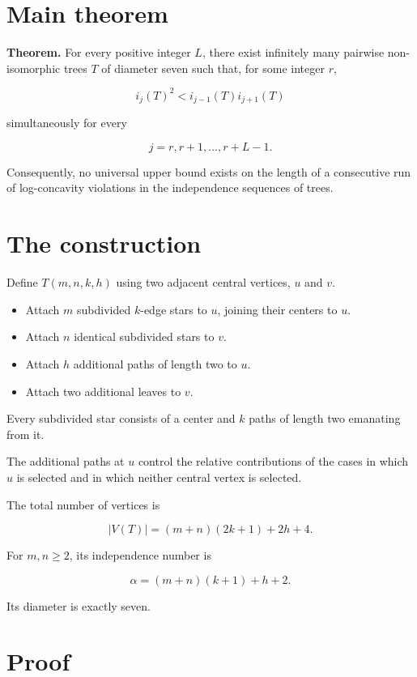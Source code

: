 \documentclass[11pt]{article}
\begin{document}
\section{Main theorem}

\textbf{Theorem.} For every positive integer \(L\), there exist infinitely many pairwise non-isomorphic trees \(T\) of diameter seven such that, for some integer \(r\),

\[
\boxed{
i_j(T)^2<i_{j-1}(T)i_{j+1}(T)
}
\]

simultaneously for every

\[
j=r,r+1,\ldots,r+L-1.
\]

Consequently, no universal upper bound exists on the length of a consecutive run of log-concavity violations in the independence sequences of trees.

\section{The construction}

Define \(T(m,n,k,h)\) using two adjacent central vertices, \(u\) and \(v\).

\begin{itemize}
\item Attach \(m\) subdivided \(k\)-edge stars to \(u\), joining their centers to \(u\).
\item Attach \(n\) identical subdivided stars to \(v\).
\item Attach \(h\) additional paths of length two to \(u\).
\item Attach two additional leaves to \(v\).

\end{itemize}
Every subdivided star consists of a center and \(k\) paths of length two emanating from it.

The additional paths at $u$ control the relative contributions of the cases in which $u$ is selected and in which neither central vertex is selected.

The total number of vertices is

\[
|V(T)|=(m+n)(2k+1)+2h+4.
\]

For \(m,n\geq 2\), its independence number is

\[
\alpha=(m+n)(k+1)+h+2.
\]

Its diameter is exactly seven.

\section{Proof}
\end{document}
